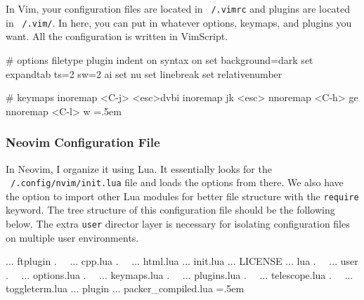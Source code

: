 \documentclass{article}
\theoremstyle{definition}
\newenvironment{cverbatim}
    {\SaveVerbatim{cverb}}
    {\endSaveVerbatim
    \flushleft\fboxrule=0pt\fboxsep=.5em
    \colorbox{cverbbg}{%
      \makebox[\dimexpr\linewidth-2\fboxsep][l]{\BUseVerbatim{cverb}}%
    }
    \endflushleft
  }
\begin{document}
      In Vim, your configuration files are located in \texttt{~/.vimrc} and plugins are located in \texttt{~/.vim/}. In here, you can put in whatever options, keymaps, and plugins you want. All the configuration is written in VimScript. 

      \begin{cverbatim} 
        # options 
        filetype plugin indent on 
        syntax on 
        set background=dark
        set expandtab ts=2 sw=2 ai
        set nu
        set linebreak 
        set relativenumber        
        
        # keymaps
        inoremap <C-j> <esc>dvbi
        inoremap jk <esc>
        nnoremap <C-h> ge
        nnoremap <C-l> w 
      \end{cverbatim}
        
    \subsubsection{Neovim Configuration File}

      In Neovim, I organize it using Lua. It essentially looks for the \texttt{~/.config/nvim/init.lua} file and loads the options from there. We also have the option to import other Lua modules for better file structure with the \texttt{require} keyword. The tree structure of this configuration file should be the following below. The extra \texttt{user} director layer is necessary for isolating configuration files on multiple user environments.  
      
      \begin{cverbatim}
        ... ftplugin
        .   ... cpp.lua
        .   ... html.lua
        ... init.lua
        ... LICENSE
        ... lua
        .   ... user
        .       ... options.lua
        .       ... keymaps.lua
        .       ... plugins.lua
        .       ... telescope.lua
        .       ... toggleterm.lua
        ... plugin
            ... packer_compiled.lua
      \end{cverbatim}
\end{document}
